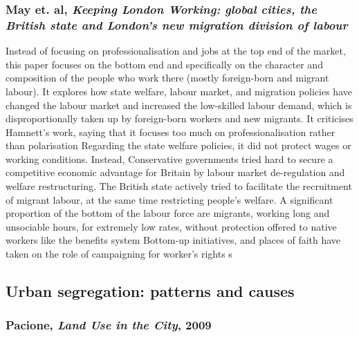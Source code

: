 \documentclass{article}
\begin{document}
\subsubsection{May et. al, \textit{Keeping London Working: global cities, the British state and London's new migration division of labour}}

\begin{outline}
	\1 Instead of focusing on professionalisation and jobs at the top end of the market, this paper focuses on the bottom end and specifically on the character and composition of the people who work there (mostly  foreign-born and migrant labour). 
	It explores how state welfare, labour market, and migration policies have changed the labour market and increased the low-skilled labour demand, which is disproportionally taken up by foreign-born workers and new migrants.
	\1 It criticises Hamnett's work, saying that it focuses too much on professionalisation rather than polarisation
	\1 Regarding the state welfare policies, it did not protect wages or working conditions. Instead, Conservative governments tried hard to secure a competitive economic advantage for Britain by labour market de-regulation and welfare restructuring. The British state actively tried to facilitate the recruitment of migrant labour, at the same time restricting people's welfare.
		\2 A significant proportion of the bottom of the labour force are migrants, working long and unsociable hours, for extremely low rates, without protection offered to native workers like the benefits system
	\1 Bottom-up initiatives, and places of faith have taken on the role of campaigning for worker's rights s
\end{outline}


\subsection{Urban segregation: patterns and causes}

\subsubsection{Pacione, \textit{Land Use in the City}, 2009}
\end{document}
